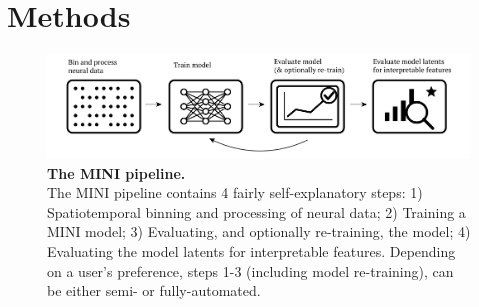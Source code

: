 \section{Methods}

\begin{figure}[h]
    \centering
    \includegraphics[width=0.95\linewidth]{figures/mini_pipeline.pdf}
    \caption{
        \textbf{The MINI pipeline.} \\
        \small The MINI pipeline contains 4 fairly self-explanatory steps: 1) Spatiotemporal binning and processing of neural data; 2) Training a MINI model; 3) Evaluating, and optionally re-training, the model; 4) Evaluating the model latents for interpretable features. Depending on a user's preference, steps 1-3 (including model re-training), can be either semi- or fully-automated.
    }
    \label{fig:mini_pipeline}
\end{figure}




